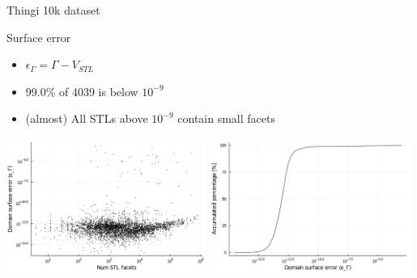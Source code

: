 \documentclass{beamer}
\begin{document}
\begin{frame}{Thingi 10k dataset}

  \begin{block}{Surface error}
  \begin{itemize}
    \item
      $\epsilon_\Gamma = \Gamma - V_{STL}$
    \item
      99.0\% of 4039 is below $10^{-9}$
    \item
      (almost) All STLs above $10^{-9}$ contain small facets
  \end{itemize}
  \end{block}

  \includegraphics[width=0.49\textwidth]{../analysis/plots/num_stl_facets_surface_error}
  \includegraphics[width=0.49\textwidth]{../analysis/plots/histogram_surface_error}
\end{frame}
\end{document}

